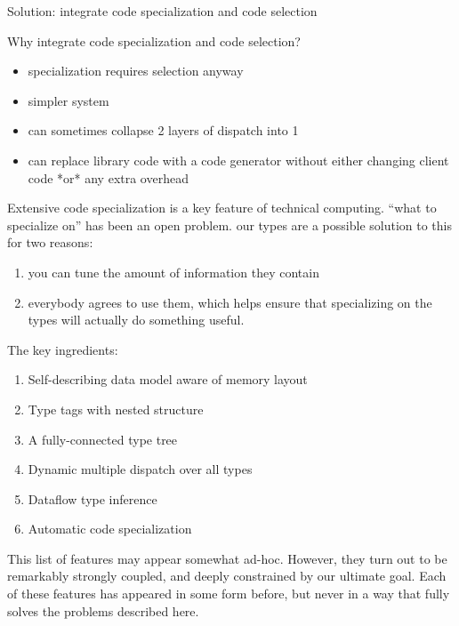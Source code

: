 

Solution: integrate code specialization and code selection

Why integrate code specialization and code selection?

\begin{itemize}
\item specialization requires selection anyway
\item simpler system
\item can sometimes collapse 2 layers of dispatch into 1
\item can replace library code with a code generator without either changing
  client code *or* any extra overhead
\end{itemize}

Extensive code specialization is a key feature of
technical computing. ``what to specialize on'' has been an open problem.
our types are a possible solution to this for two reasons:

\begin{enumerate}
\item you can tune the amount of information they contain
\item everybody agrees to use them, which helps ensure that specializing on
  the types will actually do something useful.
\end{enumerate}


The key ingredients:

\begin{singlespace}
\begin{enumerate}
\item Self-describing data model aware of memory layout
\item Type tags with nested structure
\item A fully-connected type tree
\item Dynamic multiple dispatch over all types %
\item Dataflow type inference
\item Automatic code specialization
\end{enumerate}
\end{singlespace}

This list of features may appear somewhat ad-hoc. However, they turn out to be
remarkably strongly coupled, and deeply constrained by our ultimate goal.
Each of these features has appeared in some form before, but never in a way
that fully solves the problems described here.

